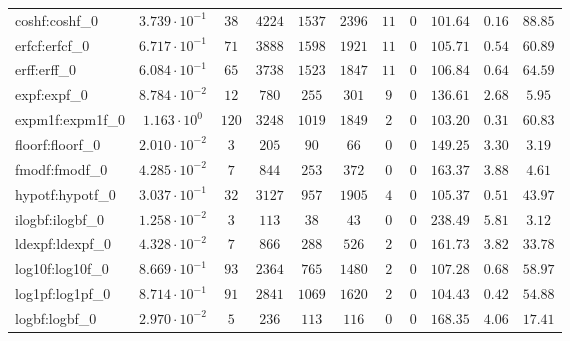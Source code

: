 \begin{tabular}{|l|c|c|c|c|c|c|c|c|c|c|}
coshf:coshf\_0               & $ 3.739 \cdot 10^{-1} $ & $ 38     $ & $ 4224  $ & $ 1537  $ & $ 2396  $ & $ 11  $ & $ 0 $ & $ 101.64      $ & $ 0.16    $ & $ 88.85   $ \\
erfcf:erfcf\_0               & $ 6.717 \cdot 10^{-1} $ & $ 71     $ & $ 3888  $ & $ 1598  $ & $ 1921  $ & $ 11  $ & $ 0 $ & $ 105.71      $ & $ 0.54    $ & $ 60.89   $ \\
erff:erff\_0                 & $ 6.084 \cdot 10^{-1} $ & $ 65     $ & $ 3738  $ & $ 1523  $ & $ 1847  $ & $ 11  $ & $ 0 $ & $ 106.84      $ & $ 0.64    $ & $ 64.59   $ \\
expf:expf\_0                 & $ 8.784 \cdot 10^{-2} $ & $ 12     $ & $ 780   $ & $ 255   $ & $ 301   $ & $ 9   $ & $ 0 $ & $ 136.61      $ & $ 2.68    $ & $ 5.95    $ \\
expm1f:expm1f\_0             & $ 1.163 \cdot 10^{0}  $ & $ 120    $ & $ 3248  $ & $ 1019  $ & $ 1849  $ & $ 2   $ & $ 0 $ & $ 103.20      $ & $ 0.31    $ & $ 60.83   $ \\
floorf:floorf\_0             & $ 2.010 \cdot 10^{-2} $ & $ 3      $ & $ 205   $ & $ 90    $ & $ 66    $ & $ 0   $ & $ 0 $ & $ 149.25      $ & $ 3.30    $ & $ 3.19    $ \\
fmodf:fmodf\_0               & $ 4.285 \cdot 10^{-2} $ & $ 7      $ & $ 844   $ & $ 253   $ & $ 372   $ & $ 0   $ & $ 0 $ & $ 163.37      $ & $ 3.88    $ & $ 4.61    $ \\
hypotf:hypotf\_0             & $ 3.037 \cdot 10^{-1} $ & $ 32     $ & $ 3127  $ & $ 957   $ & $ 1905  $ & $ 4   $ & $ 0 $ & $ 105.37      $ & $ 0.51    $ & $ 43.97   $ \\
ilogbf:ilogbf\_0             & $ 1.258 \cdot 10^{-2} $ & $ 3      $ & $ 113   $ & $ 38    $ & $ 43    $ & $ 0   $ & $ 0 $ & $ 238.49      $ & $ 5.81    $ & $ 3.12    $ \\
ldexpf:ldexpf\_0             & $ 4.328 \cdot 10^{-2} $ & $ 7      $ & $ 866   $ & $ 288   $ & $ 526   $ & $ 2   $ & $ 0 $ & $ 161.73      $ & $ 3.82    $ & $ 33.78   $ \\
log10f:log10f\_0             & $ 8.669 \cdot 10^{-1} $ & $ 93     $ & $ 2364  $ & $ 765   $ & $ 1480  $ & $ 2   $ & $ 0 $ & $ 107.28      $ & $ 0.68    $ & $ 58.97   $ \\
log1pf:log1pf\_0             & $ 8.714 \cdot 10^{-1} $ & $ 91     $ & $ 2841  $ & $ 1069  $ & $ 1620  $ & $ 2   $ & $ 0 $ & $ 104.43      $ & $ 0.42    $ & $ 54.88   $ \\
logbf:logbf\_0               & $ 2.970 \cdot 10^{-2} $ & $ 5      $ & $ 236   $ & $ 113   $ & $ 116   $ & $ 0   $ & $ 0 $ & $ 168.35      $ & $ 4.06    $ & $ 17.41   $ \\

\end{tabular}
